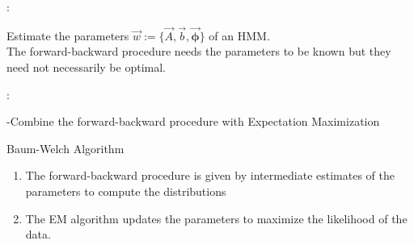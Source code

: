 \begin{frame}{\subsecname:~\subsubsecname}

Estimate the parameters $\vec{w} := \{
		\vec{A},
		\vec{b},
		\vec{\boldsymbol{\phi}}
		\}$ of an HMM.\\
		
The forward-backward procedure needs the parameters to be known but they need not necessarily be optimal.

\pause


\end{frame}

\begin{frame}{\subsecname:~\subsubsecname}


\pause

-Combine the forward-backward procedure with Expectation Maximization


\end{frame}

\begin{frame}{\subsubsecname}

\begin{block}{Baum-Welch Algorithm}
\begin{enumerate}
\item The forward-backward procedure is given by intermediate estimates of the parameters to compute the distributions
\item The EM algorithm updates the parameters to maximize the likelihood of the data.
\end{enumerate}
\end{block}

\end{frame}

